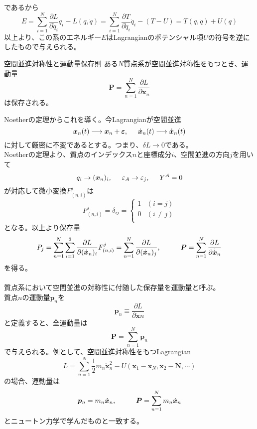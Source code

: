 \documentclass{jsarticle}
\begin{document}
であるから
\[
    E=\sum_{i=1}^{N}\frac{\partial L}{\partial\dot{q}_{i}}\dot{q}_{i}-L(q,\dot{q})
    =\sum_{i=1}^{N}\frac{\partial T}{\partial\dot{q}_{i}}\dot{q}_{i}-(T-U)
    =T(q,\dot{q})+U(q)
\]
以上より、この系のエネルギー\(E\)はLagrangianのポテンシャル項\(U\)の符号を逆にしたもので与えられる。\\
\begin{itembox}[l]{空間並進対称性と運動量保存則}
    ある\(N\)質点系が空間並進対称性をもつとき、運動量
    \[\bm{P}=\sum_{n=1}^{N}\frac{\partial L}{\partial\dot{\bm{x}}_{n}}\]
    は保存される。
\end{itembox}
Noetherの定理からこれを導く。今Lagrangianが空間並進\\
\[\bm{x}_{n}(t)\longrightarrow\bm{x}_{n}+\bm{\varepsilon},\hspace{5mm}
\dot{\bm{x}}_{n}(t)\longrightarrow\dot{\bm{x}}_{n}(t)\]
に対して厳密に不変であるとする。つまり、\(\delta L\to0\)である。\\
Noetherの定理より、質点のインデックス\(n\)と座標成分\(i\)、空間並進の方向\(j\)を用いて
\[q_{i}\to(\bm{x}_{n})_{i},\hspace{5mm}\varepsilon_{A}\to\varepsilon_{j},\hspace{5mm}Y^{A}=0\]
が対応して微小変換\(F_{(n,i)}^{j}\)は
\[F_{(n,i)}^{j}=\delta_{ij}=\begin{cases}
    1 & (i=j)\\
    0 & (i\neq j)\\
\end{cases}\]
となる。以上より保存量
\[P_{j}=\sum_{n=1}^{N}\sum_{i=1}^{3}\frac{\partial L}{\partial(\dot{\bm{x}}_{n})_{i}}F_{(n,i)}^{j}
=\sum_{n=1}^{N}\frac{\partial L}{\partial(\dot{\bm{x}}_{n})_{j}},\hspace{10mm}\bm{P}
=\sum_{n=1}^{N}\frac{\partial L}{\partial\dot{\dot{\bm{x}}}_{n}}\]
を得る。\\
\\
質点系において空間並進の対称性に付随した保存量を運動量と呼ぶ。\\
質点\(n\)の運動量\(\bm{p}_{n}\)を
\[\bm{p}_{n}\equiv\frac{\partial L}{\partial\dot{\bm{x}}{n}}\]
と定義すると、全運動量は
\[\bm{P}=\sum_{n=1}^{N}\bm{p}_{n}\]
で与えられる。例として、空間並進対称性をもつLagrangian
\[L=\sum_{n=1}^{N}\frac{1}{2}m_{n}\dot{\bm{x}}_{n}^{2}-U(\bm{x}_{1}-\bm{x}_{N},\bm{x}_{2}-\bm{N},\cdots)\]
の場合、運動量は
\[\bm{p}_{n}=m_{n}\dot{\bm{x}}_{n},\hspace{10mm}\bm{P}=\sum_{n=1}^{N}m_{n}\dot{\bm{x}}_{n}\]
とニュートン力学で学んだものと一致する。\\
\end{document}
